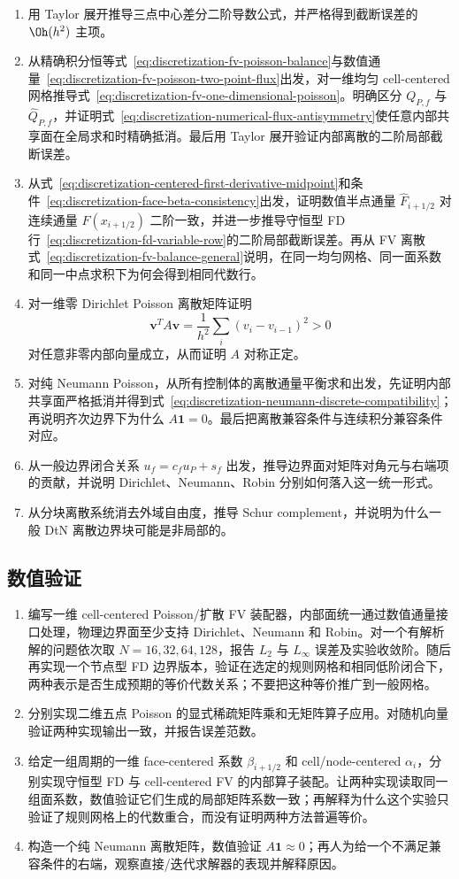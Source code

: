 \begin{enumerate}[label=\arabic*.]
\item 用 Taylor 展开推导三点中心差分二阶导数公式，并严格得到截断误差的 $\Oh(h^2)$ 主项。
\item 从精确积分恒等式~\eqref{eq:discretization-fv-poisson-balance}与数值通量~\eqref{eq:discretization-fv-poisson-two-point-flux}出发，对一维均匀 cell-centered 网格推导式~\eqref{eq:discretization-fv-one-dimensional-poisson}。明确区分 $Q_{P,f}$ 与 $\widehat Q_{P,f}$，并证明式~\eqref{eq:discretization-numerical-flux-antisymmetry}使任意内部共享面在全局求和时精确抵消。最后用 Taylor 展开验证内部离散的二阶局部截断误差。
\item 从式~\eqref{eq:discretization-centered-first-derivative-midpoint}和条件~\eqref{eq:discretization-face-beta-consistency}出发，证明数值半点通量 $\widehat F_{i+1/2}$ 对连续通量 $F(x_{i+1/2})$ 二阶一致，并进一步推导守恒型 FD 行~\eqref{eq:discretization-fd-variable-row}的二阶局部截断误差。再从 FV 离散式~\eqref{eq:discretization-fv-balance-general}说明，在同一均匀网格、同一面系数和同一中点求积下为何会得到相同代数行。
\item 对一维零 Dirichlet Poisson 离散矩阵证明
\[
\bm v^T A\bm v
=\frac{1}{h^2}\sum_i (v_i-v_{i-1})^2>0
\]
对任意非零内部向量成立，从而证明 $A$ 对称正定。
\item 对纯 Neumann Poisson，从所有控制体的离散通量平衡求和出发，先证明内部共享面严格抵消并得到式~\eqref{eq:discretization-neumann-discrete-compatibility}；再说明齐次边界下为什么 $A\bm1=0$。最后把离散兼容条件与连续积分兼容条件对应。
\item 从一般边界闭合关系 $u_f=c_fu_P+s_f$ 出发，推导边界面对矩阵对角元与右端项的贡献，并说明 Dirichlet、Neumann、Robin 分别如何落入这一统一形式。
\item 从分块离散系统消去外域自由度，推导 Schur complement，并说明为什么一般 DtN 离散边界块可能是非局部的。
\end{enumerate}

\subsection*{数值验证}
\begin{enumerate}[label=\arabic*.]
\item 编写一维 cell-centered Poisson/扩散 FV 装配器，内部面统一通过数值通量接口处理，物理边界面至少支持 Dirichlet、Neumann 和 Robin。对一个有解析解的问题依次取 $N=16,32,64,128$，报告 $L_2$ 与 $L_\infty$ 误差及实验收敛阶。随后再实现一个节点型 FD 边界版本，验证在选定的规则网格和相同低阶闭合下，两种表示是否生成预期的等价代数关系；不要把这种等价推广到一般网格。
\item 分别实现二维五点 Poisson 的显式稀疏矩阵乘和无矩阵算子应用。对随机向量验证两种实现输出一致，并报告误差范数。
\item 给定一组周期的一维 face-centered 系数 $\beta_{i+1/2}$ 和 cell/node-centered $\alpha_i$，分别实现守恒型 FD 与 cell-centered FV 的内部算子装配。让两种实现读取同一组面系数，数值验证它们生成的局部矩阵系数一致；再解释为什么这个实验只验证了规则网格上的代数重合，而没有证明两种方法普遍等价。
\item 构造一个纯 Neumann 离散矩阵，数值验证 $A\bm1\approx0$；再人为给一个不满足兼容条件的右端，观察直接/迭代求解器的表现并解释原因。
\end{enumerate}

